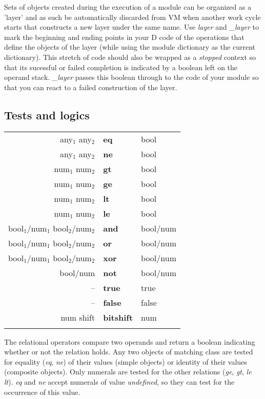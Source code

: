 Sets of objects created during the execution of a module can be organized as a 'layer' and as such be automatically discarded from VM when another work cycle starts that constructs a new layer under the same name. Use \emph{layer} and \emph{\_layer} to mark the beginning and ending points in your D code of the operations that define the objects of the layer (while using the module dictionary as the current dictionary). This stretch of code should also be wrapped as a \emph{stopped} context so that its sucessful or failed completion is indicated by a boolean left on the operand stack. \emph{\_layer} passes this boolean through to the code of your module so that you can react to a failed construction of the layer.


\subsection{Tests and logics}

\begin{tabular}{>{\sffamily}r>{\sffamily\bfseries}l>{\sffamily}l}
any$_1$ any$_2$ & eq & bool\\
any$_1$ any$_2$ & ne & bool\\
num$_1$ num$_2$ & gt & bool\\
num$_1$ num$_2$ & ge & bool\\
num$_1$ num$_2$ & lt & bool\\
num$_1$ num$_2$ & le & bool\\
bool$_1$/num$_1$ bool$_2$/num$_2$ & and & bool/num\\
bool$_1$/num$_1$ bool$_2$/num$_2$ & or & bool/num\\
bool$_1$/num$_1$ bool$_2$/num$_2$ & xor & bool/num\\
bool/num & not & bool/num\\
-- & true & true\\
-- & false & false\\
num shift & bitshift & num\\\\
\end{tabular}


The  relational  operators  compare two operands  and  return  a  boolean indicating whether or not the relation holds.  Any two objects of matching class are tested for equality (\emph{eq}, \emph{ne}) of their values (simple objects) or identity of their values (composite objects). Only numerals are tested for the other relations (\emph{ge},  \emph{gt}, \emph{le} \emph{lt}). \emph{eq} and \emph{ne} accept numerals of value \emph{undefined}, so they can test for the occurrence of this value.

